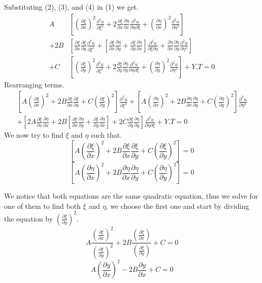 Substituting (2), (3), and (4) in (1) we get.
\begin{align*}
       A&\left[{(\frac{\partial\xi}{\partial x})}^2\frac{\partial^2 u}{\partial\xi^2}+2\frac{\partial\xi}{\partial x}\frac{\partial\eta}{\partial x}\frac{\partial^2 u}{\partial\eta\partial\xi}+{(\frac{\partial\eta}{\partial x})}^2\frac{\partial^2 u}{\partial\eta^2}\right]
    \\ +2B&\left[\frac{\partial\xi}{\partial x}\frac{\partial\xi}{\partial y}\frac{\partial^2 u}{\partial\xi^2}+\left[\frac{\partial\xi}{\partial x}\frac{\partial\eta}{\partial y}+\frac{\partial\xi}{\partial y}\frac{\partial\eta}{\partial x}\right]\frac{\partial^2 u}{\partial\xi\partial\eta}+\frac{\partial\eta}{\partial x}\frac{\partial\eta}{\partial y}\frac{\partial^2 u}{\partial\eta^2}\right] 
    \\ +C&\left[{(\frac{\partial\xi}{\partial y})}^2\frac{\partial^2 u}{\partial\xi^2}+2\frac{\partial\xi}{\partial y}\frac{\partial\eta}{\partial y}\frac{\partial^2 u}{\partial\eta\partial\xi}+{(\frac{\partial\eta}{\partial y})}^2\frac{\partial^2 u}{\partial\eta^2}\right]+Y.T =0    
\end{align*}
\newpage
Rearranging terms.
\begin{align*}
\left[A{(\frac{\partial\xi}{\partial x})}^2+2B\frac{\partial\xi}{\partial x}\frac{\partial\xi}{\partial y}+C{(\frac{\partial\xi}{\partial y})}^2\right]\frac{\partial^2 u}{\partial\xi^2}+\left[A{(\frac{\partial\eta}{\partial x})}^2+2B\frac{\partial\eta}{\partial x}\frac{\partial\eta}{\partial y}+C{(\frac{\partial\eta}{\partial y})}^2\right]\frac{\partial^2 u}{\partial\eta^2}\\
+\left[2A\frac{\partial\xi}{\partial x}\frac{\partial\eta}{\partial x}+2B\left[\frac{\partial\xi}{\partial x}\frac{\partial\eta}{\partial y}+\frac{\partial\xi}{\partial y}\frac{\partial\eta}{\partial x}\right]+2C\frac{\partial\xi}{\partial y}\frac{\partial\eta}{\partial y}\right]\frac{\partial^2 u}{\partial\eta\partial\xi}+Y.T=0
\end{align*}
We now try to find $\xi$ and $\eta$ such that.
\[
    \left[A{(\frac{\partial\xi}{\partial x})}^2+2B\frac{\partial\xi}{\partial x}\frac{\partial\xi}{\partial y}+C{(\frac{\partial\xi}{\partial y})}^2\right] =0    
\]
\[
    \left[A{(\frac{\partial\eta}{\partial x})}^2+2B\frac{\partial\eta}{\partial x}\frac{\partial\eta}{\partial y}+C{(\frac{\partial\eta}{\partial y})}^2\right]=0    
\]

We notice that both equations are the same quadratic equation, thus we solve for one of them to find both $\xi$ and $\eta$, we choose the first one and start by dividing the equation by $\displaystyle {\left(\frac{\partial\xi}{\partial y}\right)}^2$.
\[
    A\frac{{(\frac{\partial\xi}{\partial x})}^2}{{(\frac{\partial\xi}{\partial y})}^2}+2B\frac{\left(\frac{\partial\xi}{\partial x}\right)}{\left(\frac{\partial\xi}{\partial y}\right)}+C =0    
\]
\[
    A{(\frac{\partial y}{\partial x})}^2-2B\frac{\partial y}{\partial x}+C =0    
\]

